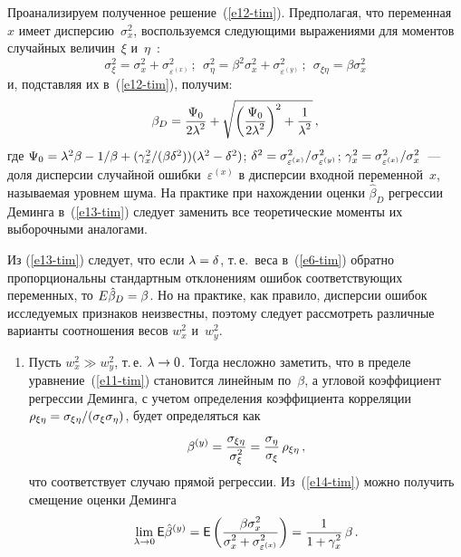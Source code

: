 \begin{multicols}{2}
  Проанализируем полученное решение~(\ref{e12-tim}). Предполагая, что
переменная~$x$ имеет дис\-пер\-сию~$\sigma_x^2$, воспользуемся
следующими выражениями для моментов случайных величин~$\xi$
и~$\eta$~\cite{10-tim}:
  $$
  \sigma^2_\xi=\sigma^2_x+\sigma^2_{\varepsilon^{(x)}}\,;\ \ 
  \sigma^2_\eta=\beta^2\sigma^2_x+\sigma^2_{\varepsilon^{(y)}}\,;\ \ 
  \sigma_{\xi\eta}= \beta \sigma_x^2
  $$
и, подставляя их в~(\ref{e12-tim}), получим:
\begin{equation}
\beta_D =\displaystyle\frac{\displaystyle \Psi_0\mathstrut}{\displaystyle 2\lambda^2\mathstrut}+\sqrt{\left( \displaystyle\frac{\displaystyle \Psi_0\mathstrut}{\displaystyle 2\lambda^2\mathstrut}\right)^2
+\displaystyle\frac{\displaystyle 1\mathstrut}{\displaystyle \lambda^2\mathstrut}}\,,
\label{e13-tim}
\end{equation}
где $\Psi_0=\lambda^2\beta \hm- 1/\beta
+(\gamma_x^2/(\beta\delta^2))(\lambda^2 \hm- \delta^2)$; $\delta^2\hm=
\sigma^2_{\varepsilon^{(x)}}/\sigma^2_{\varepsilon^{(y)}}$;
$\gamma_x^2\hm=\sigma^2_{\varepsilon^{(x)}}/\sigma_x^2$~--- доля
дисперсии случайной ошибки~$\varepsilon^{(x)}$ в дисперсии входной
переменной~$x$, называемая уровнем шума. На практике при нахождении
оценки $\hat{\beta}_D$ регрессии Деминга в~(\ref{e13-tim}) следует заменить
все теоретические моменты их выборочными аналогами.

  Из (\ref{e13-tim}) следует, что если $\lambda\hm=\delta$, т.\,е.\ веса
в~(\ref{e6-tim}) обратно пропорциональны стандартным отклонениям
ошибок соответствующих переменных, то $E\hat{\beta}_D\hm=\beta$. Но на
практике, как правило, дис\-пер\-сии ошибок исследуемых признаков 
неизвестны, поэтому следует рассмотреть различные варианты соотношения
весов $w_x^2$ и~$w_y^2$.
  \begin{enumerate}[1.]
  \item
Пусть $w_x^2\gg w_y^2$, т.\,е. $\lambda\hm\to 0$. Тогда несложно
заметить, что в пределе уравнение~(\ref{e11-tim}) становится линейным
по~$\beta$, а угловой коэффициент регрессии Деминга, с учетом
определения коэффициента корреляции $\rho_{\xi\eta} \hm=
\sigma_{\xi\eta}/(\sigma_\xi \sigma_\eta)$, будет определяться как
\begin{equation}
\beta^{(y)} = \displaystyle\frac{\displaystyle \sigma_{\xi\eta}\mathstrut}{\displaystyle \sigma^2_\xi\mathstrut} =\displaystyle\frac{\displaystyle \sigma_\eta\mathstrut}{\displaystyle \sigma_\xi\mathstrut}\,\rho_{\xi\eta}\,,
\label{e14-tim}
\end{equation}
что соответствует случаю прямой регрессии. Из~(\ref{e14-tim}) можно
получить смещение оценки Деминга
$$
\lim\limits_{\lambda\to 0} {\sf E} \hat{\beta}^{(y)} ={\sf E}\left( \displaystyle\frac{\displaystyle \beta \sigma_x^2\mathstrut}{\displaystyle \sigma_x^2+\sigma^2_{\varepsilon^{(x)}}\mathstrut} \right) = \displaystyle\frac{\displaystyle 1\mathstrut}{\displaystyle 1+\gamma_x^2\mathstrut}\,\beta\,.
$$


\end{enumerate}
\end{multicols}
